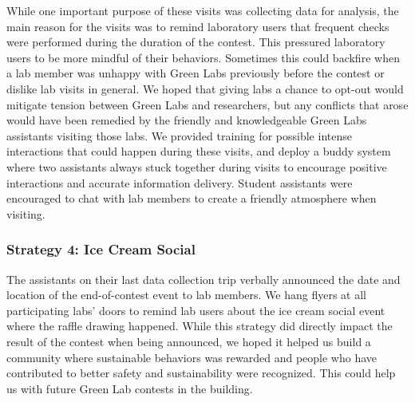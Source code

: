 \documentclass[12pt, twocolumn]{article}
\begin{document}
While one important purpose of these visits was collecting data for analysis, the main reason for the visits was to remind laboratory users that frequent checks were performed during the duration of the contest. This pressured laboratory users to be more mindful of their behaviors. Sometimes this could backfire when a lab member was unhappy with Green Labs previously before the contest or dislike lab visits in general. We hoped that giving labs a chance to opt-out would mitigate tension between Green Labs and researchers, but any conflicts that arose would have been remedied by the friendly and knowledgeable Green Labs assistants visiting those labs.  We provided training for possible intense interactions that could happen during these visits, and deploy a buddy system where two assistants always stuck together during visits to encourage positive interactions and accurate information delivery. Student assistants were encouraged to chat with lab members to create a friendly atmosphere when visiting. 

\subsubsection*{Strategy 4: Ice Cream Social}\label{Sec:Strategy4}
The assistants on their last data collection trip verbally announced the date and location of the end-of-contest event to lab members. We hang flyers at all participating labs' doors to remind lab users about the ice cream social event where the raffle drawing happened. While this strategy did directly impact the result of the contest when being announced, we hoped it helped us build a community where sustainable behaviors was rewarded and people who have contributed to better safety and sustainability were recognized. This could help us with future Green Lab contests in the building. 
\end{document}
